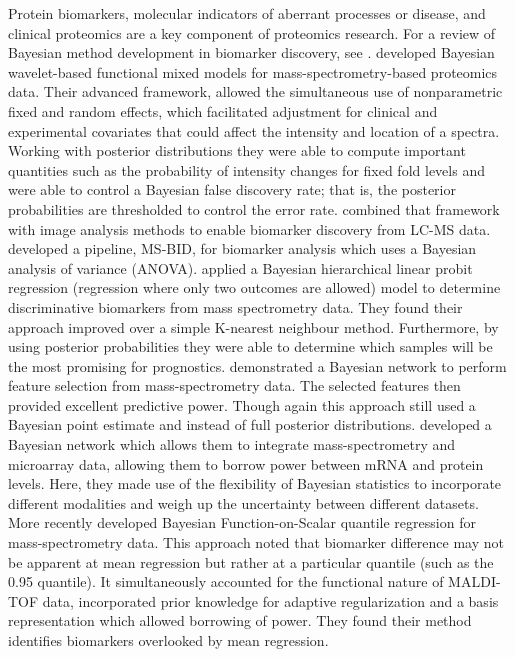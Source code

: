 \documentclass[12pt,english, journal=jpr, layout=twocolumn]{article}
\begin{document}
Protein biomarkers, molecular indicators of aberrant processes or disease, and clinical proteomics are a key component of proteomics research. For a review of Bayesian method development in biomarker discovery, see \citet{Hernandez::2015}. \citet{Morris::2006, Morris::2008} developed Bayesian wavelet-based functional mixed models for mass-spectrometry-based proteomics data. Their advanced framework, allowed the simultaneous use of nonparametric fixed and random effects, which facilitated adjustment for clinical and experimental covariates that could affect the intensity and location of a spectra. Working with posterior distributions they were able to compute important quantities such as the probability of intensity changes for fixed fold levels and were able to control a Bayesian false discovery rate; that is, the posterior probabilities are thresholded to control the error rate. \citet{Liao::2014} combined that framework with image analysis methods to enable biomarker discovery from LC-MS data. \citet{Hwang::2008} developed a pipeline, MS-BID, for biomarker analysis which uses a Bayesian analysis of variance (ANOVA). \citet{Harris::2009} applied a Bayesian hierarchical linear probit regression (regression where only two outcomes are allowed) model to determine discriminative biomarkers from mass spectrometry data. They found their approach improved over a simple K-nearest neighbour method. Furthermore, by using posterior probabilities they were able to determine which samples will be the most promising for prognostics. \citet{Kuschner::2010} demonstrated a Bayesian network to perform feature selection from mass-spectrometry data. The selected features then provided excellent predictive power. Though again this approach still used a Bayesian point estimate and instead of full posterior distributions. \citet{Deng::2007} developed a Bayesian network which allows them to integrate mass-spectrometry and microarray data, allowing them to borrow power between mRNA and protein levels. Here, they made use of the flexibility of Bayesian statistics to incorporate different modalities and weigh up the uncertainty between different datasets. More recently \citet{Liu::2020} developed Bayesian Function-on-Scalar quantile regression for mass-spectrometry data. This approach noted that biomarker difference may not be apparent at mean regression but rather at a particular quantile (such as the 0.95 quantile). It simultaneously accounted for the functional nature of MALDI-TOF data, incorporated prior knowledge for adaptive regularization and a basis representation which allowed borrowing of power. They found their method identifies biomarkers overlooked by mean regression. 
\end{document}
